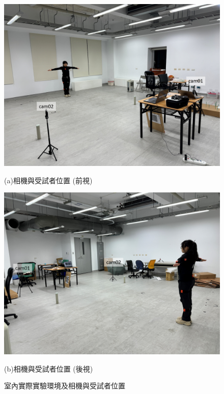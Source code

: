 \begin{figure}[!ht]
   \centering
   \begin{minipage}{.5\textwidth}
     \centering
     \includegraphics[width=\linewidth]{figure/ch3_fig_indoor_position1.png}
     \caption*{(a)相機與受試者位置 (前視)}
   \end{minipage}%
   \begin{minipage}{.5\textwidth}
      \centering
      \includegraphics[width=\linewidth]{figure/ch3_fig_indoor_position2.png}
      \caption*{(b)相機與受試者位置 (後視)}
   \end{minipage}%
   \caption[室內實際實驗環境及相機與受試者位置]{室內實際實驗環境及相機與受試者位置}
   \label{ch3_fig_indoor_position}
\end{figure}

